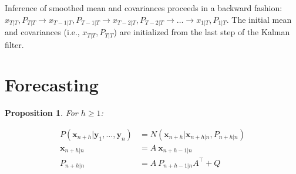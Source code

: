 \documentclass[12pt]{article}
\newtheorem{proposition}{Proposition}
\begin{document}
Inference of smoothed mean and covariances proceeds in a backward fashion:
$x_{T|T}, P_{T|T}\rightarrow x_{T-1|T}, P_{T-1|T}\rightarrow x_{T-2|T},
P_{T-2|T}\rightarrow\ldots\rightarrow  x_{1|T}, P_{1|T}$. The initial mean and
covariances (i.e., $x_{T|T}, P_{T|T}$) are initialized from the last step of
the Kalman filter.

\section{Forecasting}

\begin{proposition}

    For $h\ge 1$:

    \begin{align*}
        P(\mathbf{x}_{n+h}|\mathbf{y}_1,\ldots,\mathbf{y}_{n})&=N(\mathbf{x}_{n+h}|\mathbf{x}_{n+h|n},P_{n+h|n})\\
        \mathbf{x}_{n+h|n}&=A\ \mathbf{x}_{n+h-1|n}\\
        P_{n+h|n}&=A\ P_{n+h-1|n}A^\intercal+Q\\
    \end{align*}

\end{proposition}
\end{document}
